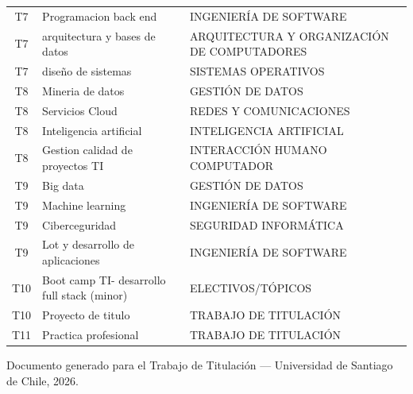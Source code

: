 \documentclass[11pt,a4paper]{article}
\begin{document}
\begin{small}
\begin{longtable}{c >{\raggedright\arraybackslash}p{8.5cm} >{\raggedright\arraybackslash}p{5.5cm}}
T7 & Programacion back end & INGENIERÍA DE SOFTWARE \\
T7 & arquitectura y bases de datos & ARQUITECTURA Y ORGANIZACIÓN DE COMPUTADORES \\
T7 & diseño de sistemas & SISTEMAS OPERATIVOS \\
T8 & Mineria de datos & GESTIÓN DE DATOS \\
T8 & Servicios Cloud & REDES Y COMUNICACIONES \\
T8 & Inteligencia artificial & INTELIGENCIA ARTIFICIAL \\
T8 & Gestion calidad de proyectos TI & INTERACCIÓN HUMANO COMPUTADOR \\
T9 & Big data & GESTIÓN DE DATOS \\
T9 & Machine learning & INGENIERÍA DE SOFTWARE \\
T9 & Ciberceguridad & SEGURIDAD INFORMÁTICA \\
T9 & Lot y desarrollo de aplicaciones & INGENIERÍA DE SOFTWARE \\
T10 & Boot camp TI- desarrollo full stack (minor) & ELECTIVOS/TÓPICOS \\
T10 & Proyecto de titulo & TRABAJO DE TITULACIÓN \\
T11 & Practica profesional & TRABAJO DE TITULACIÓN \\
\end{longtable}
\end{small}


\vfill
\begin{center}
    \small\sffamily\color{gray!80}
    Documento generado para el Trabajo de Titulación --- Universidad de Santiago de Chile, 2026.
\end{center}
\end{document}
